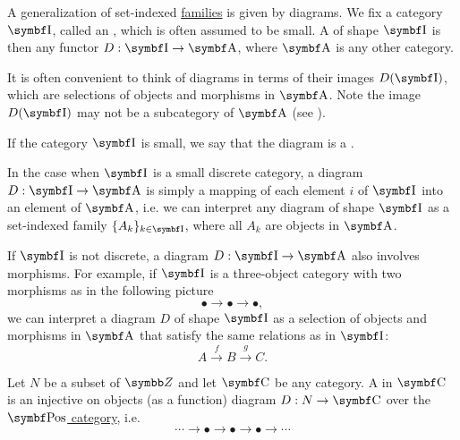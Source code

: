 \begin{definition}\label{def:categorical_diagram}
  A generalization of set-indexed \hyperref[def:indexed_family]{families} is given by diagrams. We fix a category \( \Cat{I} \), called an , which is often assumed to be small. A  of shape \( \Cat{I} \) is then any functor \( D: \Cat{I} \to \Cat{A} \), where \( \Cat{A} \) is any other category.

  It is often convenient to think of diagrams in terms of their images \( D(\Cat{I}) \), which are selections of objects and morphisms in \( \Cat{A} \). Note the image \( D(\Cat{I}) \) may not be a subcategory of \( \Cat{A} \) (see ).

  If the category \( \Cat{I} \) is small, we say that the diagram is a .
\end{definition}

\begin{example}\label{ex:categorical_diagrams}
  \mbox{}
  \begin{DefEnum}
    \item In the case when \( \Cat{I} \) is a small discrete category, a diagram \( D: \Cat{I} \to \Cat{A} \) is simply a mapping of each element \( i \) of \( \Cat{I} \) into an element of \( \Cat{A} \), i.e. we can interpret any diagram of shape \( \Cat{I} \) as a set-indexed family \( \{ A_k \}_{k \in \Cat{I}} \), where all \( A_k \) are objects in \( \Cat{A} \).

    \item If \( \Cat{I} \) is not discrete, a diagram \( D: \Cat{I} \to \Cat{A} \) also involves morphisms. For example, if \( \Cat{I} \) is a three-object category with two morphisms as in the following picture
    \begin{equation*}
      \bullet \longrightarrow \bullet \longrightarrow \bullet,
    \end{equation*}
    we can interpret a diagram \( D \) of shape \( \Cat{I} \) as a selection of objects and morphisms in \( \Cat{A} \) that satisfy the same relations as in \( \Cat{I} \):
    \begin{equation*}
      A
      \overset f \longrightarrow
      B
      \overset g \longrightarrow
      C.
    \end{equation*}
  \end{DefEnum}
\end{example}

\begin{definition}\label{def:tower_diagram}
  Let \( N \) be a subset of \( \BZ \) and let \( \Cat{C} \) be any category. A  in \( \Bold{C} \) is an injective on objects (as a function) diagram \( D: N \to \Bold{C} \) over the \hyperref[def:category_of_posets]{\( \Cat{Pos} \) category}, i.e.
  \begin{equation}\label{def:tower_diagram/diagram}
    \cdots \longrightarrow \bullet \longrightarrow \bullet \longrightarrow \bullet \longrightarrow \cdots
  \end{equation}
\end{definition}

